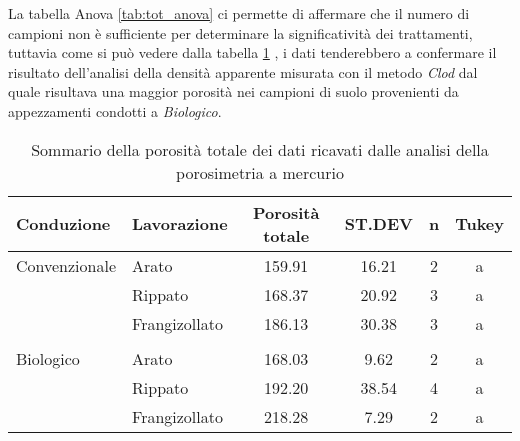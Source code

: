 \documentclass[a4paper]{article}
\begin{document}
La tabella Anova \ref{tab:tot_anova} ci permette di affermare che il
numero di campioni non \`e sufficiente per determinare la
significatività dei trattamenti, tuttavia come si può vedere dalla
tabella \ref{tab:tot_sommario} , i dati tenderebbero a confermare il
risultato dell'analisi della densità apparente misurata con il metodo
\emph{Clod} dal quale risultava una maggior porosità nei campioni di
suolo provenienti da appezzamenti condotti a \emph{Biologico}.

\begin{table}[ht]
\centering
\caption{Sommario della porosit\`a totale dei dati ricavati dalle analisi della porosimetria a mercurio} 
\label{tab:tot_sommario}
\begin{tabular}{llcccc}
  \hline
Conduzione & Lavorazione & Porosità totale & ST.DEV & n & Tukey \\ 
  \hline
Convenzionale & Arato & 159.91 & 16.21 &   2 & a \\ 
   & Rippato & 168.37 & 20.92 &   3 & a \\ 
   & Frangizollato & 186.13 & 30.38 &   3 & a \\ 
   &  &  &  &  &  \\ 
  Biologico & Arato & 168.03 & 9.62 &   2 & a \\ 
   & Rippato & 192.20 & 38.54 &   4 & a \\ 
   & Frangizollato & 218.28 & 7.29 &   2 & a \\ 
   \hline
\end{tabular}
\end{table}

\end{document}
